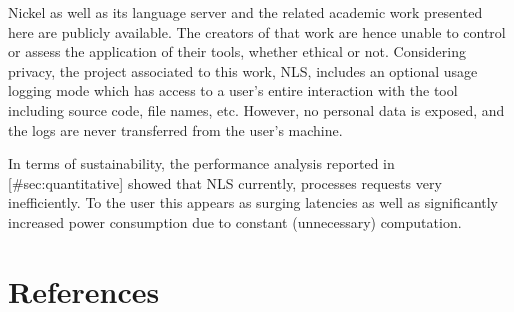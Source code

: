 \documentclass[
  a4paper,
  bibtex,
  english,
  nomenclature]{kthlatex/kththesis/kththesis}
\begin{document}
Nickel as well as its language server and the related academic work
presented here are publicly available. The creators of that work are
hence unable to control or assess the application of their tools,
whether ethical or not. Considering privacy, the project associated to
this work, NLS, includes an optional usage logging mode which has access
to a user's entire interaction with the tool including source code, file
names, etc. However, no personal data is exposed, and the logs are never
transferred from the user's machine.

In terms of sustainability, the performance analysis reported in
{[}\#sec:quantitative{]} showed that NLS currently, processes requests
very inefficiently. To the user this appears as surging latencies as
well as significantly increased power consumption due to constant
(unnecessary) computation.

\hypertarget{sec:references}{%
\chapter*{References}\label{sec:references}}
\end{document}
